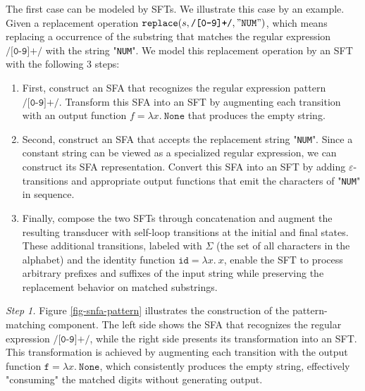 \documentclass[sigplan,10pt,anonymous,review]{acmart}\settopmatter{printfolios=true,printccs=false,printacmref=false}
\begin{document}
The first case can be modeled by SFTs. We illustrate this case by an example. Given a replacement operation $\texttt{replace}(s, \texttt{/[0-9]+/}, "\texttt{NUM}")$, which means replacing a occurrence of the substring that matches the regular expression $\texttt{/[0-9]+/}$ with the string "\texttt{NUM}".
We model this replacement operation by an SFT with the following 3 steps:

\begin{enumerate}
  \item First, construct an SFA that recognizes the regular expression pattern $\texttt{/[0-9]+/}$. Transform this SFA into an SFT by augmenting each transition with an output function $f = \lambda x.~\texttt{None}$ that produces the empty string. 
  \item Second, construct an SFA that accepts the replacement string "\texttt{NUM}". Since a constant string can be viewed as a specialized regular expression, we can construct its SFA representation. Convert this SFA into an SFT by adding $\varepsilon$-transitions  and appropriate output functions that emit the characters of "\texttt{NUM}" in sequence.
  \item Finally, compose the two SFTs through concatenation and augment the resulting transducer with self-loop transitions at the initial and final states. These additional transitions, labeled with $\Sigma$ (the set of all characters in the alphabet) and the identity function $\texttt{id}=\lambda x.~x$, enable the SFT to process arbitrary prefixes and suffixes of the input string while preserving the replacement behavior on matched substrings.
\end{enumerate}


\noindent\emph{Step 1.}
Figure \ref{fig-snfa-pattern} illustrates the construction of the pattern-matching component. The left side shows the SFA that recognizes the regular expression $\texttt{/[0-9]+/}$, while the right side presents its transformation into an SFT. This transformation is achieved by augmenting each transition with the output function $\texttt{f} = \lambda x.~\texttt{None}$, which consistently produces the empty string, effectively "consuming" the matched digits without generating output.
\end{document}
